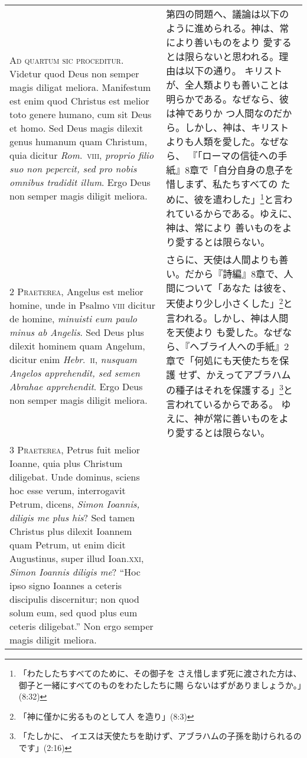 \documentclass[10pt]{jsarticle} %
\begin{document}
\begin{longtable}{p{21em}p{21em}}

{\Huge A}{\scshape d quartum sic proceditur}. Videtur quod
 Deus non semper magis diligat meliora. Manifestum est enim quod
 Christus est melior toto genere humano, cum sit Deus et homo. Sed Deus
 magis dilexit genus humanum quam Christum, quia dicitur {\itshape Rom}.~{\scshape viii},
 {\itshape proprio filio suo non pepercit, sed pro nobis omnibus tradidit
 illum}. Ergo Deus non semper magis diligit meliora.


&


第四の問題へ、議論は以下のように進められる。神は、常により善いものをより
 愛するとは限らないと思われる。理由は以下の通り。
キリストが、全人類よりも善いことは明らかである。なぜなら、彼は神でありか
 つ人間なのだから。しかし、神は、キリストよりも人類を愛した。なぜなら、
『「ローマの信徒への手紙』8章で「自分自身の息子を惜しまず、私たちすべての
 ために、彼を遣わした」\footnote{「わたしたちすべてのために、その御子を
 さえ惜しまず死に渡された方は、御子と一緒にすべてのものをわたしたちに賜
 らないはずがありましょうか。」(8:32)}と言われているからである。ゆえに、神は、常により
 善いものをより愛するとは限らない。

\\


{\scshape 2 Praeterea}, Angelus est melior homine, unde in Psalmo {\scshape viii}
 dicitur de homine, {\itshape minuisti eum paulo minus ab Angelis}. Sed Deus plus
 dilexit hominem quam Angelum, dicitur enim {\itshape Hebr}.~{\scshape ii}, {\itshape nusquam Angelos
 apprehendit, sed semen Abrahae apprehendit}. Ergo Deus non semper magis
 diligit meliora.


&


さらに、天使は人間よりも善い。だから『詩編』8章で、人間について「あなた
 は彼を、天使より少し小さくした」\footnote{「神に僅かに劣るものとして人
 を造り」(8:3)}と言われる。しかし、神は人間を天使より
 も愛した。なぜなら、『ヘブライ人への手紙』2章で「何処にも天使たちを保護
 せず、かえってアブラハムの種子はそれを保護する」\footnote{「たしかに、
 イエスは天使たちを助けず、アブラハムの子孫を助けられるのです」(2:16)}と言われているからである。
 ゆえに、神が常に善いものをより愛するとは限らない。

\\


{\scshape 3 Praeterea}, Petrus fuit melior Ioanne, quia plus Christum
 diligebat. Unde dominus, sciens hoc esse verum, interrogavit Petrum,
 dicens, {\itshape Simon Ioannis, diligis me plus his}? Sed tamen Christus plus
 dilexit Ioannem quam Petrum, ut enim dicit Augustinus, super illud
 Ioan.{\scshape xxi}, {\itshape Simon Ioannis diligis me}? ``Hoc ipso signo Ioannes a ceteris
 discipulis discernitur; non quod solum eum, sed quod plus eum ceteris
 diligebat.'' Non ergo semper magis diligit meliora.



\end{longtable}
\end{document}

